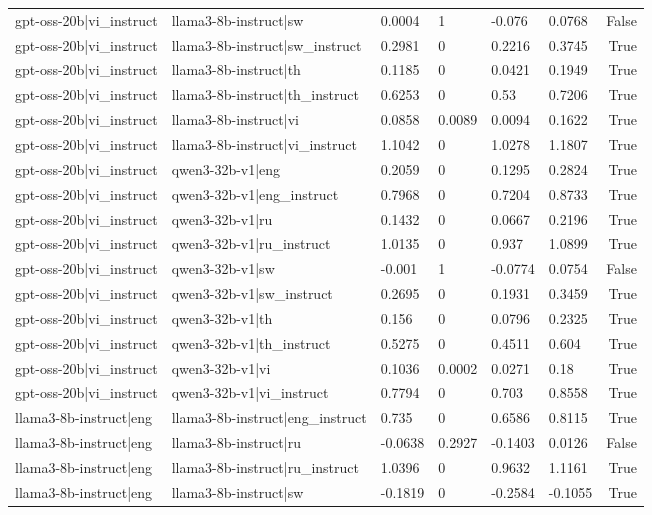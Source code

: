 \begin{table}
\begin{tabular}{llllllr}
gpt-oss-20b|vi_instruct & llama3-8b-instruct|sw & 0.0004 & 1 & -0.076 & 0.0768 & False \\
gpt-oss-20b|vi_instruct & llama3-8b-instruct|sw_instruct & 0.2981 & 0 & 0.2216 & 0.3745 & True \\
gpt-oss-20b|vi_instruct & llama3-8b-instruct|th & 0.1185 & 0 & 0.0421 & 0.1949 & True \\
gpt-oss-20b|vi_instruct & llama3-8b-instruct|th_instruct & 0.6253 & 0 & 0.53 & 0.7206 & True \\
gpt-oss-20b|vi_instruct & llama3-8b-instruct|vi & 0.0858 & 0.0089 & 0.0094 & 0.1622 & True \\
gpt-oss-20b|vi_instruct & llama3-8b-instruct|vi_instruct & 1.1042 & 0 & 1.0278 & 1.1807 & True \\
gpt-oss-20b|vi_instruct & qwen3-32b-v1|eng & 0.2059 & 0 & 0.1295 & 0.2824 & True \\
gpt-oss-20b|vi_instruct & qwen3-32b-v1|eng_instruct & 0.7968 & 0 & 0.7204 & 0.8733 & True \\
gpt-oss-20b|vi_instruct & qwen3-32b-v1|ru & 0.1432 & 0 & 0.0667 & 0.2196 & True \\
gpt-oss-20b|vi_instruct & qwen3-32b-v1|ru_instruct & 1.0135 & 0 & 0.937 & 1.0899 & True \\
gpt-oss-20b|vi_instruct & qwen3-32b-v1|sw & -0.001 & 1 & -0.0774 & 0.0754 & False \\
gpt-oss-20b|vi_instruct & qwen3-32b-v1|sw_instruct & 0.2695 & 0 & 0.1931 & 0.3459 & True \\
gpt-oss-20b|vi_instruct & qwen3-32b-v1|th & 0.156 & 0 & 0.0796 & 0.2325 & True \\
gpt-oss-20b|vi_instruct & qwen3-32b-v1|th_instruct & 0.5275 & 0 & 0.4511 & 0.604 & True \\
gpt-oss-20b|vi_instruct & qwen3-32b-v1|vi & 0.1036 & 0.0002 & 0.0271 & 0.18 & True \\
gpt-oss-20b|vi_instruct & qwen3-32b-v1|vi_instruct & 0.7794 & 0 & 0.703 & 0.8558 & True \\
llama3-8b-instruct|eng & llama3-8b-instruct|eng_instruct & 0.735 & 0 & 0.6586 & 0.8115 & True \\
llama3-8b-instruct|eng & llama3-8b-instruct|ru & -0.0638 & 0.2927 & -0.1403 & 0.0126 & False \\
llama3-8b-instruct|eng & llama3-8b-instruct|ru_instruct & 1.0396 & 0 & 0.9632 & 1.1161 & True \\
llama3-8b-instruct|eng & llama3-8b-instruct|sw & -0.1819 & 0 & -0.2584 & -0.1055 & True \\

\end{tabular}
\end{table}
